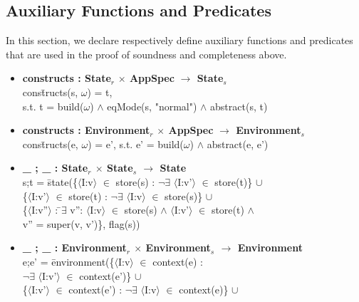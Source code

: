 \documentclass[conference]{IEEEtran}
\begin{document}
\subsection{Auxiliary Functions and Predicates}\label{subsec:afp}
In this section, we declare respectively define auxiliary functions and predicates that are used in the proof of soundness and completeness above.
\begin{itemize}
\item \begin{tabbing}\textbf{constructs : State$_r$} \textbf{$\times$ AppSpec} \textbf{$\rightarrow$ State$_s$}
\\cons\=tructs(s, $\omega$) = t,
\\\> s.t. t = build($\omega$) $\wedge$ eqMode(s, "normal") $\wedge$ abstract(s, t)
\end{tabbing}
\item \begin{tabbing}\textbf{constructs : Environment$_r$} \textbf{$\times$ AppSpec} \textbf{$\rightarrow$ Environment$_s$}
\\cons\=tructs(e, $\omega$) = e', s.t. e' = build($\omega$) $\wedge$ abstract(e, e')
\end{tabbing}
\item \begin{tabbing}\textbf{\_ ; \_ : State$_r$ $\times$ State$_s$ $\rightarrow$ State}
\\ s;t = \=state(\{$\langle$I:v$\rangle$ $\in$ store(s) : $\neg \exists$ $\langle$I:v'$\rangle$ $\in$ store(t)\} $\cup$ 
\\\>\{$\langle$I:v'$\rangle$ $\in$ store(t) : $\neg \exists$ $\langle$I:v$\rangle$ $\in$ store(s)\} $\cup$
\\\>\{$\langle$I:v''$\rangle$ : \=$\exists$ v'': $\langle$I:v$\rangle$ $\in$ store(s) $\wedge$ $\langle$I:v'$\rangle$ $\in$ store(t) $\wedge$ 
\\\>\>v'' = super(v, v')\}, flag(s))
\end{tabbing}
\item \begin{tabbing}\textbf{\_ ; \_ : Environment$_r$ $\times$ Environment$_s$ $\rightarrow$ Environment}
\\ e;e' = \=environment(\{$\langle$I:v$\rangle$ $\in$ context(e) : 
\\\>$\neg \exists$ $\langle$I:v'$\rangle$ $\in$ context(e')\} $\cup$ 
\\\>\{$\langle$I:v'$\rangle$ $\in$ context(e') : $\neg \exists$ $\langle$I:v$\rangle$ $\in$ context(e)\} $\cup$

\end{tabbing}
\end{itemize}
\end{document}
